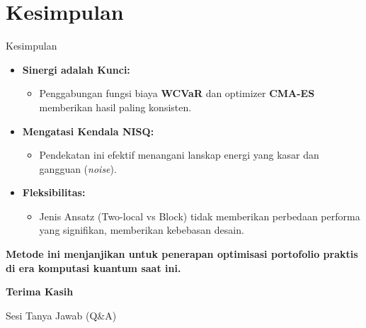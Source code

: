 \documentclass[10pt]{beamer}
\begin{document}
\section{Kesimpulan}
\begin{frame}{Kesimpulan}
    \begin{itemize}
        \item \textbf{Sinergi adalah Kunci:}
        \begin{itemize}
            \item Penggabungan fungsi biaya \textbf{WCVaR} dan optimizer \textbf{CMA-ES} memberikan hasil paling konsisten.
        \end{itemize}
        \item \textbf{Mengatasi Kendala NISQ:}
        \begin{itemize}
            \item Pendekatan ini efektif menangani lanskap energi yang kasar dan gangguan (\textit{noise}).
        \end{itemize}
        \item \textbf{Fleksibilitas:}
        \begin{itemize}
            \item Jenis Ansatz (Two-local vs Block) tidak memberikan perbedaan performa yang signifikan, memberikan kebebasan desain.
        \end{itemize}
    \end{itemize}
    
    \vspace{0.5cm}
    \centering
    \textbf{Metode ini menjanjikan untuk penerapan optimisasi portofolio praktis di era komputasi kuantum saat ini.}
\end{frame}

\begin{frame}
    \centering
    \Huge \textbf{Terima Kasih}
    
    \vspace{1cm}
    \Large Sesi Tanya Jawab (Q\&A)
\end{frame}
\end{document}
